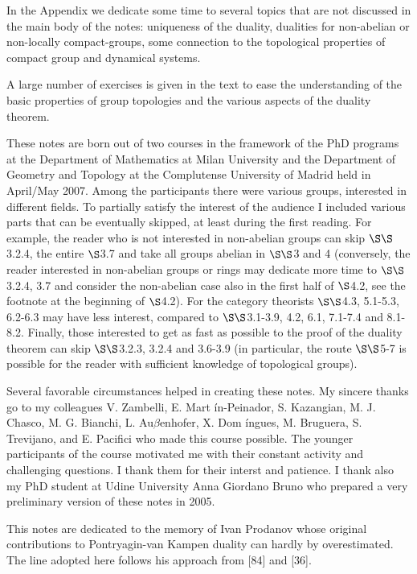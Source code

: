 \documentclass[12pt]{article}
\begin{document}
    In the Appendix we dedicate some time to several topics that are not discussed in the main body of the
notes: uniqueness of the duality, dualities for non-abelian or non-locally compact-groups, some connection to
the topological properties of compact group and dynamical systems.


    A large number of exercises is given in the text to ease the understanding of the basic properties of group
topologies and the various aspects of the duality theorem.
   

    These notes are born out of two courses in the framework of the PhD programs at the Department of
Mathematics at Milan University and the Department of Geometry and Topology at the Complutense University
of Madrid held in April/May 2007. Among the participants there were various groups, interested in different
fields. To partially satisfy the interest of the audience I included various parts that can be eventually skipped,
at least during the first reading. For example, the reader who is not interested in non-abelian groups can skip
$ \S\S $3.2.4, the entire $ \S $3.7 and take all groups abelian in $ \S\S $3 and 4 (conversely, the reader interested in non-abelian
groups or rings may dedicate more time to $ \S\S $3.2.4, 3.7 and consider the non-abelian case also in the first half of
$ \S $4.2, see the footnote at the beginning of $ \S $4.2). For the category theorists $ \S\S $4.3, 5.1-5.3, 6.2-6.3 may have less
interest, compared to $ \S\S $3.1-3.9, 4.2, 6.1, 7.1-7.4 and 8.1-8.2. Finally, those interested to get as fast as possible
to the proof of the duality theorem can skip $ \S\S $3.2.3, 3.2.4 and 3.6-3.9 (in particular, the route $ \S\S $5-7 is possible
for the reader with sufficient knowledge of topological groups).


    Several favorable circumstances helped in creating these notes. My sincere thanks go to my colleagues V.
Zambelli, E. Mart \'in-Peinador, S. Kazangian, M. J. Chasco, M. G. Bianchi, L. Au$ \beta $enhofer, X. Dom \'ingues,
M. Bruguera, S. Trevijano, and E. Pacifici who made this course possible. The younger participants of the
course motivated me with their constant activity and challenging questions. I thank them for their interst
and patience. I thank also my PhD student at Udine University Anna Giordano Bruno who prepared a very
preliminary version of these notes in 2005.


    This notes are dedicated to the memory of Ivan Prodanov whose original contributions to Pontryagin-van
Kampen duality can hardly by overestimated. The line adopted here follows his approach from [84] and [36].
\end{document}
